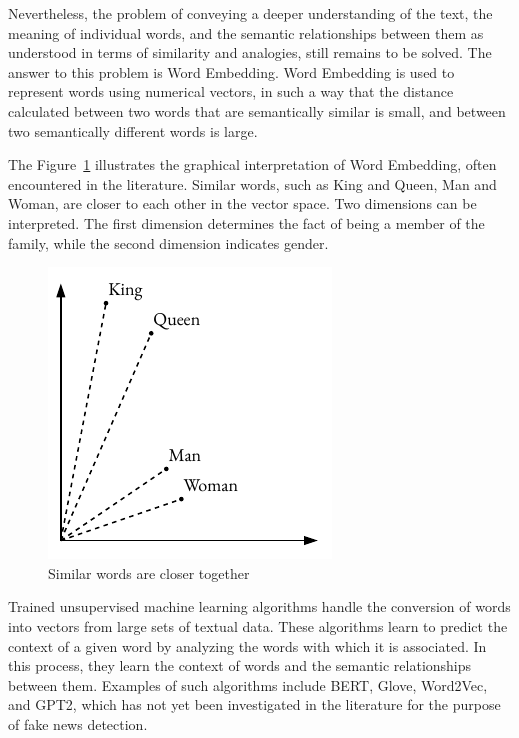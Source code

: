 Nevertheless, the problem of conveying a deeper understanding of the text, the meaning of individual words, and the semantic relationships between them as understood in terms of similarity and analogies, still remains to be solved. The answer to this problem is Word Embedding. Word Embedding is used to represent words using numerical vectors, in such a way that the distance calculated between two words that are semantically similar is small, and between two semantically different words is large.

The Figure~\ref{embedding_example} illustrates the graphical interpretation of Word Embedding, often encountered in the literature. Similar words, such as King and Queen, Man and Woman, are closer to each other in the vector space. Two dimensions can be interpreted. The first dimension determines the fact of being a member of the family, while the second dimension indicates gender.

\begin{figure}[hbt!]
\centering
\includegraphics[width=0.55\linewidth]{embedding_example.pdf}
\caption{Similar words are closer together}
\label{embedding_example}
\end{figure}

Trained unsupervised machine learning algorithms handle the conversion of words into vectors from large sets of textual data. These algorithms learn to predict the context of a given word by analyzing the words with which it is associated. In this process, they learn the context of words and the semantic relationships between them. Examples of such algorithms include BERT, Glove, Word2Vec, and GPT2, which has not yet been investigated in the literature for the purpose of fake news detection.

